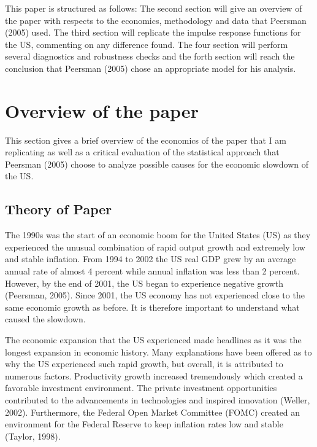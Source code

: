 \documentclass[11pt,preprint, authoryear]{elsarticle}
\numberwithin{equation}{section}
\numberwithin{figure}{section}
\numberwithin{table}{section}
\begin{document}
This paper is structured as follows: The second section will give an
overview of the paper with respects to the economics, methodology and
data that Peersman (2005) used. The third section will replicate the
impulse response functions for the US, commenting on any difference
found. The four section will perform several diagnostics and robustness
checks and the forth section will reach the conclusion that Peersman
(2005) chose an appropriate model for his analysis.

\hypertarget{overview-of-the-paper}{%
\section{Overview of the paper}\label{overview-of-the-paper}}

This section gives a brief overview of the economics of the paper that I
am replicating as well as a critical evaluation of the statistical
approach that Peersman (2005) choose to analyze possible causes for the
economic slowdown of the US.

\hypertarget{theory-of-paper}{%
\subsection{Theory of Paper}\label{theory-of-paper}}

The 1990s was the start of an economic boom for the United States (US)
as they experienced the unusual combination of rapid output growth and
extremely low and stable inflation. From 1994 to 2002 the US real GDP
grew by an average annual rate of almost 4 percent while annual
inflation was less than 2 percent. However, by the end of 2001, the US
began to experience negative growth (Peersman, 2005). Since 2001, the US
economy has not experienced close to the same economic growth as before.
It is therefore important to understand what caused the slowdown.

The economic expansion that the US experienced made headlines as it was
the longest expansion in economic history. Many explanations have been
offered as to why the US experienced such rapid growth, but overall, it
is attributed to numerous factors. Productivity growth increased
tremendously which created a favorable investment environment. The
private investment opportunities contributed to the advancements in
technologies and inspired innovation (Weller, 2002). Furthermore, the
Federal Open Market Committee (FOMC) created an environment for the
Federal Reserve to keep inflation rates low and stable (Taylor, 1998).
\end{document}
